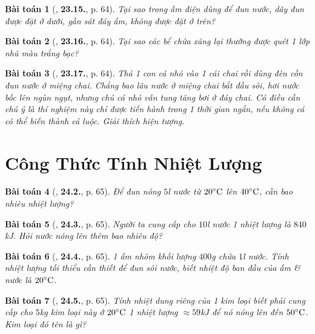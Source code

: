 \documentclass{article}
\numberwithin{equation}{section}
\newtheorem{baitoan}{Bài toán}
\begin{document}
\begin{baitoan}[\cite{SBT_Vat_Ly_8}, \textbf{23.15.}, p. 64]
	Tại sao trong ấm điện dùng để đun nước, dây đun được đặt ở dưới, gần sát đáy ấm, không được đặt ở trên?
\end{baitoan}

\begin{baitoan}[\cite{SBT_Vat_Ly_8}, \textbf{23.16.}, p. 64]
	Tại sao các bể chứa xăng lại thường được quét 1 lớp nhũ màu trắng bạc?
\end{baitoan}

\begin{baitoan}[\cite{SBT_Vat_Ly_8}, \textbf{23.17.}, p. 64]
	Thả 1 con cá nhỏ vào 1 cái chai rồi dùng đèn cồn đun nước ở miệng chai. Chẳng bao lâu nước ở miệng chai bắt đầu sôi, hơi nước bốc lên ngùn ngụt, nhưng chú cá nhỏ vẫn tung tăng bơi ở đáy chai. Có điều cần chú ý là thí nghiệm này chỉ được tiến hành trong 1 thời gian ngắn, nếu không cá có thể biến thành cá luộc. Giải thích hiện tượng.
\end{baitoan}


\section{Công Thức Tính Nhiệt Lượng}

\begin{baitoan}[\cite{SBT_Vat_Ly_8}, \textbf{24.2.}, p. 65]
	Để đun nóng $5$\emph{l} nước từ $20^\circ{\rm C}$ lên $40^\circ{\rm C}$, cần bao nhiêu nhiệt lượng?
\end{baitoan}

\begin{baitoan}[\cite{SBT_Vat_Ly_8}, \textbf{24.3.}, p. 65]
	Người ta cung cấp cho $10$\emph{l} nước 1 nhiệt lượng là $840$\emph{kJ}. Hỏi nước nóng lên thêm bao nhiêu độ?
\end{baitoan}

\begin{baitoan}[\cite{SBT_Vat_Ly_8}, \textbf{24.4.}, p. 65]
	1 ấm nhôm khối lượng $400$\emph{g} chứa $1$\emph{l} nước. Tính nhiệt lượng tối thiểu cần thiết để đun sôi nước, biết nhiệt độ ban đầu của ấm \& nước là $20^\circ{\rm C}$.
\end{baitoan}

\begin{baitoan}[\cite{SBT_Vat_Ly_8}, \textbf{24.5.}, p. 65]
	Tính nhiệt dung riêng của 1 kim loại biết phải cung cấp cho $5$\emph{kg} kim loại này ở $20^\circ{\rm C}$ 1 nhiệt lượng $\approx59$\emph{kJ} để nó nóng lên đến $50^\circ{\rm C}$. Kim loại đó tên là gì?
\end{baitoan}
\end{document}
